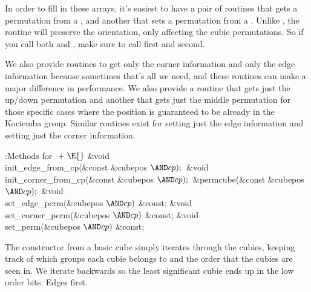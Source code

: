 In order to fill in these arrays, it's easiest to have a pair of
routines that gets a permutation from a , and another that
sets a permutation from a .  Unlike , the
 routine will preserve the orientation, only affecting the
cubie permutations.  So if you call both  and ,
make sure to call  first and  second.

We also provide routines to get only the corner information and
only the edge information because sometimes that's all we need,
and these routines can make a major difference in performance.
We also provide a routine that gets just the up/down permutation
and another that gets just the middle permutation for those
specific cases where the position is guaranteed to be already
in the Kociemba group.  Similar routines exist for setting
just the edge information and setting just the corner information.

\Y\B\4:Methods for \X${}\mathrel+\E{}$\6
\&{void} \\{init\_edge\_from\_cp}(\&{const} \&{cubepos} ${}{\AND}\\{cp});{}$\6
\&{void} \\{init\_corner\_from\_cp}(\&{const} \&{cubepos} ${}{\AND}\\{cp});{}$\7
\&{permcube}(\&{const} \&{cubepos} ${}{\AND}\\{cp});{}$\7
\&{void} \\{set\_edge\_perm}(\&{cubepos} ${}{\AND}\\{cp}){}$ \&{const};\6
\&{void} \\{set\_corner\_perm}(\&{cubepos} ${}{\AND}\\{cp}){}$ \&{const};\6
\&{void} \\{set\_perm}(\&{cubepos} ${}{\AND}\\{cp}){}$ \&{const};\par
\fi

The constructor from a basic cube simply iterates through the
cubies, keeping track of which groups each cubie belongs to and
the order that the cubies are seen in.  We iterate backwards so
the least significant cubie ends up in the low order bits.  Edges
first.

